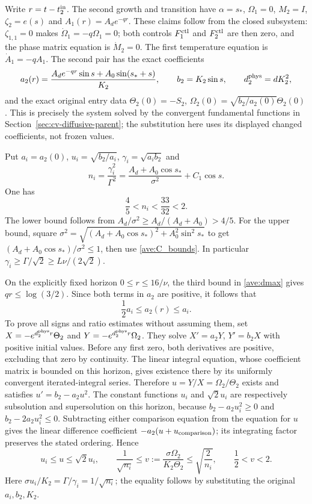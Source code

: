 Write $r=t-t_2^{\rm in}$. The second growth and transition have
$\alpha=s_*$, $\Omega_1=0$, $M_2=I$, $\zeta_2=e(s)$ and
$A_1(r)=A_de^{-qr}$. These claims follow from the closed subsystem:
$\zeta_{1,1}=0$ makes $\dot\Omega_1=-q\Omega_1=0$;
both controls $F_1^{\rm ctl}$ and $F_2^{\rm ctl}$ are then zero,
and the phase matrix equation is $\dot M_2=0$. The first temperature
equation is $\dot A_1=-qA_1$.
The second pair has the exact coefficients
\begin{equation}\label{ave:growth_coefficients}
 a_2(r)=\frac{A_de^{-qr}\sin s+A_0\sin(s_*+s)}{K_2},
 \qquad b_2=K_2\sin s,
 \qquad d_2^{\rm phys}=dK_2^2,
\end{equation}
and the exact original entry data
$\Theta_2(0)=-S_2$, $\Omega_2(0)=\sqrt{b_2/a_2(0)}\Theta_2(0)$.
This is precisely the system solved by the convergent fundamental
functions in Section~\ref{sec:cv-diffusive-parent}; the substitution
here uses its displayed changed coefficients, not frozen values.

Put $a_i=a_2(0)$, $u_i=\sqrt{b_2/a_i}$,
$\gamma_i=\sqrt{a_i b_2}$ and
\[
 n_i=\frac{\gamma_i^2}{\Gamma^2}
 =\frac{A_d+A_0\cos s_*}{\sigma^2}+C_1\cos s.
\]
One has
\begin{equation}\label{ave:ni_bounds}
 \frac45<n_i<\frac{33}{32}<2.
\end{equation}
The lower bound follows from
$A_d/\sigma^2\geq A_d/(A_d+A_0)>4/5$.
For the upper bound, square
$\sigma^2=\sqrt{(A_d+A_0\cos s_*)^2+A_0^2\sin^2s_*}$
to get $(A_d+A_0\cos s_*)/\sigma^2\leq1$, then use
\eqref{ave:C_bounds}. In particular
$\gamma_i\geq\Gamma/\sqrt2\geq L\nu/(2\sqrt2)$.

On the explicitly fixed horizon $0\leq r\leq16/\nu$, the third
bound in \eqref{ave:dmax} gives $qr\leq\log(3/2)$. Since both
terms in $a_2$ are positive, it follows that
\begin{equation}\label{ave:coeff_interval}
 \frac12a_i\leq a_2(r)\leq a_i.
\end{equation}
To prove all signs and ratio estimates without assuming them, set
$X=-e^{d_2^{\rm phys}r}\Theta_2$ and
$Y=-e^{d_2^{\rm phys}r}\Omega_2$. They solve
$X'=a_2Y$, $Y'=b_2X$ with positive initial values.
Before any first zero, both derivatives are positive, excluding that
zero by continuity. The linear integral equation, whose coefficient
matrix is bounded on this horizon, gives existence there by its
uniformly convergent iterated-integral series.
Therefore $u=Y/X=\Omega_2/\Theta_2$ exists and satisfies
$u'=b_2-a_2u^2$. The constant functions $u_i$ and $\sqrt2u_i$
are respectively subsolution and supersolution on this horizon,
because $b_2-a_2u_i^2\geq0$ and
$b_2-2a_2u_i^2\leq0$. Subtracting either comparison equation
from the equation for $u$ gives the linear difference coefficient
$-a_2(u+u_{\rm comparison})$; its integrating factor preserves
the stated ordering. Hence
\begin{equation}\label{ave:ratio_growth}
 u_i\leq u\leq\sqrt2u_i,\qquad
 \frac1{\sqrt{n_i}}\leq
 v:=\frac{\sigma\Omega_2}{K_2\Theta_2}
 \leq\sqrt{\frac2{n_i}},\qquad\frac12<v<2.
\end{equation}
Here $\sigma u_i/K_2=\Gamma/\gamma_i=1/\sqrt{n_i}$;
the equality follows by substituting the original $a_i,b_2,K_2$.

